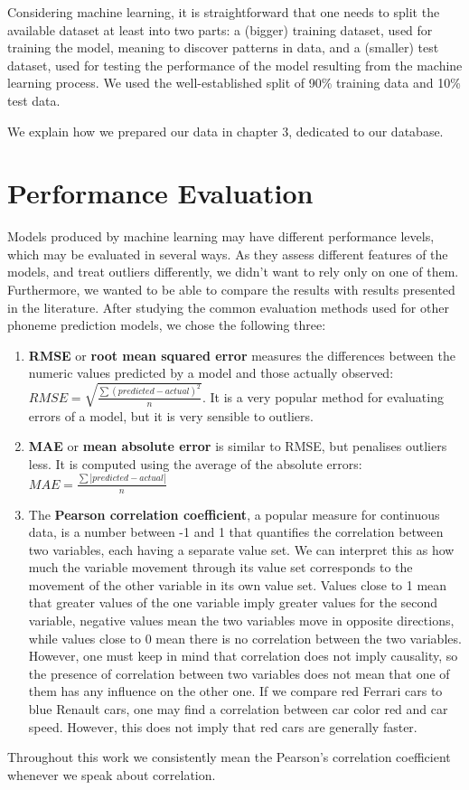 \documentclass[11pt,a4paper]{scrbook}
\begin{document}
Considering machine learning, it is straightforward that one needs to split the available dataset at least into two parts: a (bigger) training dataset, used for training the model, meaning to discover patterns in data, and a (smaller) test dataset, used for testing the performance of the model resulting from the machine learning process. We used the well-established split of 90\% training data and 10\% test data.

We explain how we prepared our data in chapter 3, dedicated to our database.

\section{Performance Evaluation}
Models produced by machine learning may have different performance levels, which may be evaluated in several ways. As they assess different features of the models, and treat outliers differently, we didn't want to rely only on one of them. Furthermore, we wanted to be able to compare the results with results presented in the literature. After studying the common evaluation methods used for other phoneme prediction models, we chose the following three: 
\begin{enumerate}
	\item \textbf{RMSE} or \textbf{root mean squared error} measures the differences between the numeric values predicted by a model and those actually observed: 
$RMSE = \sqrt{\frac{\sum(predicted-actual)^2}{n}}$. It is a very popular method for evaluating errors of a model, but it is very sensible to outliers.
	\item \textbf{MAE} or \textbf{mean absolute error} is similar to RMSE, but penalises outliers less. It is computed using the average of the absolute errors: $MAE = \frac{\sum\left|predicted-actual\right|}{n}$
	\item The \textbf{Pearson correlation coefficient}, a popular measure for continuous data, is a number between -1 and 1 that quantifies the correlation between two variables, each having a separate value set. We can interpret this as how much the variable movement through its value set corresponds to the movement of the other variable in its own value set. Values close to 1 mean that greater values of the one variable imply greater values for the second variable, negative values mean the two variables move in opposite directions, while values close to 0 mean there is no correlation between the two variables. However, one must keep in mind that correlation does not imply causality, so the presence of correlation between two variables does not mean that one of them has any influence on the other one. If we compare red Ferrari cars to blue Renault cars, one may find a correlation between car color red and car speed. However, this does not imply that red cars are generally faster.
\end{enumerate}
Throughout this work we consistently mean the Pearson's correlation coefficient whenever we speak about correlation.
\end{document}
